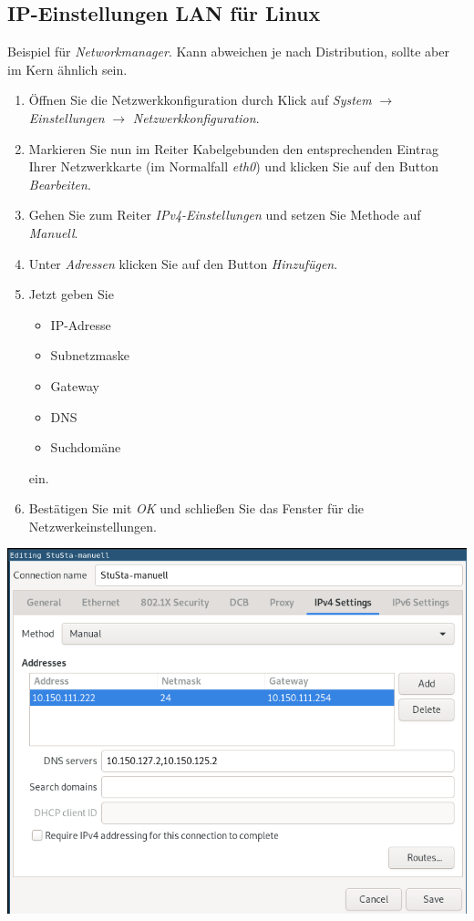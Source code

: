 \documentclass[a4paper,12pt]{scrartcl}
\begin{document}
\subsection{IP-Einstellungen LAN für Linux}

Beispiel für \textit{Networkmanager}.
Kann abweichen je nach Distribution, sollte aber im Kern ähnlich sein.

\begin{minipage}{0.57\textwidth}
\begin{enumerate}
	\item Öffnen Sie die Netzwerkkonfiguration durch Klick auf \emph{System} $\rightarrow$ \emph{Einstellungen} $\rightarrow$ \emph{Netzwerkkonfiguration}.
	\item Markieren Sie nun im Reiter Kabelgebunden den entsprechenden Eintrag Ihrer Netzwerkkarte (im Normalfall \emph{eth0}) und klicken Sie auf den Button \emph{Bearbeiten}.
	\item Gehen Sie zum Reiter \emph{IPv4-Einstellungen} und setzen Sie Methode auf \emph{Manuell}.
	\item Unter \emph{Adressen} klicken Sie auf den Button \emph{Hinzufügen}.
	\item Jetzt geben Sie
	\begin{itemize}
		\item IP-Adresse
		\item Subnetzmaske
		\item Gateway
		\item DNS
		\item Suchdomäne
	\end{itemize}
	ein.
	\item Bestätigen Sie mit \emph{OK} und schließen Sie das Fenster für die Netzwerkeinstellungen.
\end{enumerate}
\end{minipage}
\hfill
\begin{minipage}{0.4\textwidth}
\includegraphics[width=\linewidth]{Bilder/IP_Ubuntu_neu}
\end{minipage}
\end{document}
